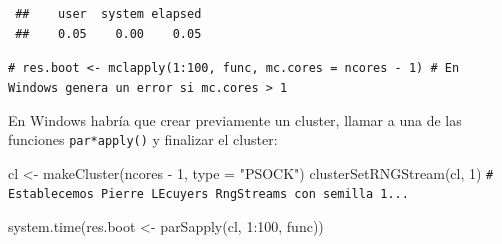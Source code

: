 \documentclass[
]{book}
\newenvironment{Shaded}{\begin{snugshade}}{\end{snugshade}}
\newcommand{\AttributeTok}[1]{\textcolor[rgb]{0.77,0.63,0.00}{#1}}
\newcommand{\CommentTok}[1]{\textcolor[rgb]{0.56,0.35,0.01}{\textit{#1}}}
\newcommand{\ConstantTok}[1]{\textcolor[rgb]{0.00,0.00,0.00}{#1}}
\newcommand{\ControlFlowTok}[1]{\textcolor[rgb]{0.13,0.29,0.53}{\textbf{#1}}}
\newcommand{\DecValTok}[1]{\textcolor[rgb]{0.00,0.00,0.81}{#1}}
\newcommand{\FunctionTok}[1]{\textcolor[rgb]{0.00,0.00,0.00}{#1}}
\newcommand{\NormalTok}[1]{#1}
\newcommand{\OtherTok}[1]{\textcolor[rgb]{0.56,0.35,0.01}{#1}}
\newcommand{\SpecialCharTok}[1]{\textcolor[rgb]{0.00,0.00,0.00}{#1}}
\newcommand{\StringTok}[1]{\textcolor[rgb]{0.31,0.60,0.02}{#1}}
\theoremstyle{break}
\theoremstyle{nonumberplain}
\renewcommand{\CommentTok}[1]{\textcolor[rgb]{0.41,0.41,0.41}{\texttt{#1}}}
\begin{document}
\begin{Shaded}
\end{Shaded}

\begin{verbatim}
 ##    user  system elapsed 
 ##    0.05    0.00    0.05
\end{verbatim}

\begin{Shaded}
\begin{Highlighting}[]
\CommentTok{\# res.boot \textless{}{-} mclapply(1:100, func, mc.cores = ncores {-} 1) \# En Windows genera un error si mc.cores \textgreater{} 1}
\end{Highlighting}
\end{Shaded}

En Windows habría que crear previamente un cluster, llamar a una de las funciones \texttt{par*apply()} y finalizar el cluster:

\begin{Shaded}
\begin{Highlighting}[]
\NormalTok{cl }\OtherTok{\textless{}{-}} \FunctionTok{makeCluster}\NormalTok{(ncores }\SpecialCharTok{{-}} \DecValTok{1}\NormalTok{, }\AttributeTok{type =} \StringTok{"PSOCK"}\NormalTok{)}
\FunctionTok{clusterSetRNGStream}\NormalTok{(cl, }\DecValTok{1}\NormalTok{) }\CommentTok{\# Establecemos Pierre L\textquotesingle{}Ecuyer\textquotesingle{}s RngStreams con semilla 1...}

\FunctionTok{system.time}\NormalTok{(res.boot }\OtherTok{\textless{}{-}} \FunctionTok{parSapply}\NormalTok{(cl, }\DecValTok{1}\SpecialCharTok{:}\DecValTok{100}\NormalTok{, func))}
\end{Highlighting}
\end{Shaded}
\end{document}
